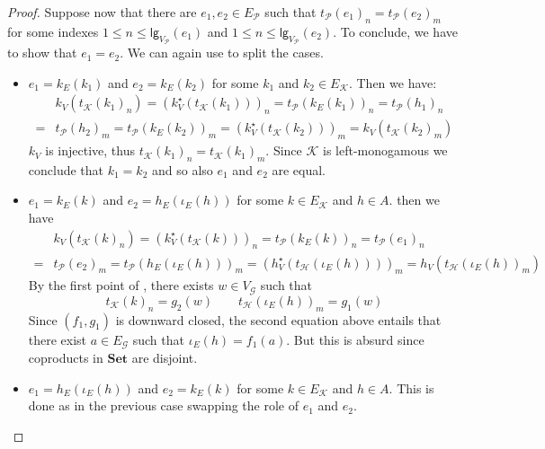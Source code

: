 \documentclass[3p]{elsarticle}
\newcommand{\lgh}{\mathsf{lg}}
\newcommand{\Set}{\mathbf{Set}}
\theoremstyle{remark}
\theoremstyle{definition}
\begin{document}
\begin{proof}
 Suppose now that there are $e_1, e_2\in E_{\mathcal{P}}$ such that $t_{\mathcal{P}}(e_1)_n=t_{\mathcal{P}}(e_2)_m$ for some indexes $1\leq n \leq \lgh_{V_{\mathcal{P}}}(e_1)$ and $1\leq n \leq \lgh_{V_{\mathcal{P}}}(e_2)$. To conclude, we have to show that $e_1=e_2$. We can again use  to split the cases.
 
\begin{itemize}
	\item $e_1=k_E(k_1)$ and $e_2=k_E(k_2)$ for some $k_1$ and $k_2\in E_{\mathcal{K}}$. Then we have:
	\begin{align*}
		&k_V(t_{\mathcal{K}}(k_1)_n)=(k^\star_V(t_{\mathcal{K}}(k_1)))_n=t_{\mathcal{P}}(k_E(k_1))_n=t_{\mathcal{P}}(h_1)_n\\=&t_{\mathcal{P}}(h_2)_m=t_{\mathcal{P}}(k_E(k_2))_m=(k^\star_V(t_{\mathcal{K}}(k_2)))_m=k_V(t_{\mathcal{K}}(k_2)_m)
	\end{align*}
	$k_V$ is injective, thus $t_{\mathcal{K}}(k_1)_n=t_{\mathcal{K}}(k_1)_m$. Since  $\mathcal{K}$ is left-monogamous we conclude that $k_1=k_2$ and so also $e_1$ and $e_2$ are equal.
	\item $e_1=k_E(k)$ and $e_2=h_E(\iota_{E}(h))$ for some $k\in E_{\mathcal{K}}$ and $h\in A$. 
	then we have
	\begin{align*}
		&k_V(t_{\mathcal{K}}(k)_n)= (k^\star_V(t_{\mathcal{K}}(k)))_n=t_{\mathcal{P}}(k_E(k))_n=t_{\mathcal{P}}(e_1)_n\\=&t_{\mathcal{P}}(e_2)_m=t_{\mathcal{P}}(h_E(\iota_E(h)))_m=(h^\star_V(t_{\mathcal{H}}(\iota_E(h))))_m= h_V(t_{\mathcal{H}}(\iota_{E}(h))_m)
	\end{align*}
	By the first point of , there exists $w\in V_{\mathcal{G}}$ such that 
	\[t_{\mathcal{K}}(k)_n=g_2(w) \qquad t_{\mathcal{H}}(\iota_{E}(h))_m=g_1(w)\]
Since $(f_1, g_1)$ is downward closed, the second equation above entails that there exist $a\in E_{\mathcal{G}}$ such that $\iota_E(h)=f_1(a)$. But this is absurd since coproducts in $\Set$ are disjoint.
	
	\item  $e_1=h_E(\iota_{E}(h))$ and $e_2=k_E(k)$ for some $k\in E_{\mathcal{K}}$ and $h\in A$. This is done as in the previous case swapping the role of $e_1$ and $e_2$.
	

\end{itemize}
\end{proof}
\end{document}
